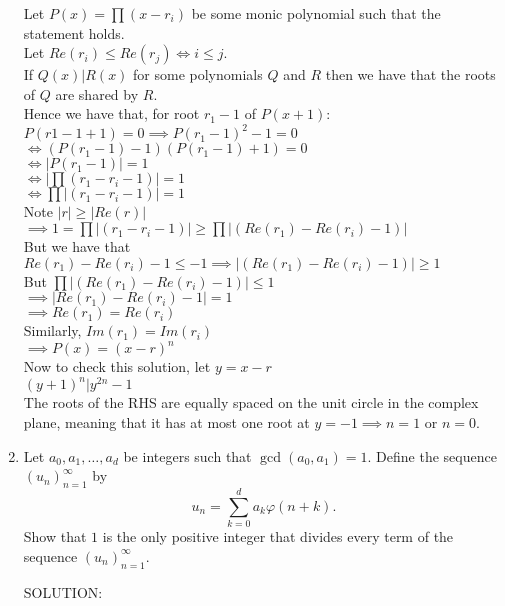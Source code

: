\documentclass{article}
\begin{document}
\begin{enumerate}[1.]
Let $P(x) = \prod (x-r_{i})$ be some monic polynomial such that the statement holds.\\
Let $Re(r_{i}) \leq Re(r_{j})\iff {i} \leq {j}$.\\
If $Q(x)|R(x)$ for some polynomials $Q$ and $R$ then we have that the roots of $Q$ are shared by $R$.\\
Hence we have that, for root $r_{1}-1$ of $P(x+1)$:\\
$P(r{1}-1+1) = 0\implies P(r_{1}-1)^{2}-1 = 0$\\
$\iff (P(r_{1}-1)-1)(P(r_{1}-1)+1) = 0$\\
$\iff |P(r_{1}-1)| = 1$\\
$\iff |\prod (r_{1}-r_{i}-1)| = 1$\\
$\iff \prod|(r_{1}-r_{i}-1)| = 1$\\
Note $|r| \geq |Re(r)|$\\
$\implies 1 = \prod|(r_{1}-r_{i}-1)| \geq \prod|(Re(r_{1})-Re(r_{i})-1)|$\\
But we have that $Re(r_{1})-Re(r_{i})-1 \leq -1 \implies |(Re(r_{1})-Re(r_{i})-1)| \geq 1$\\
But $\prod|(Re(r_{1})-Re(r_{i})-1)| \leq 1$\\ 
$\implies |Re(r_{1})-Re(r_{i})-1| = 1$\\
$\implies Re(r_{1}) = Re(r_{i})$\\
Similarly, $Im(r_{1}) = Im(r_{i})$\\
$\implies P(x) = (x-r)^{n}$\\
Now to check this solution, let $y = x-r$\\
$(y+1)^{n}|y^{2n}-1$\\
The roots of the RHS are equally spaced on the unit circle in the complex plane, meaning that it has at most one root at $y=-1\implies n=1$ or $n=0$.

\vfill
\item %
Let $a_0, a_1, \dots, a_d$ be integers such that $\gcd(a_0, a_1) = 1$. Define the sequence $(u_n)_{n=1}^{\infty}$ by
\[
  u_n = \sum_{k = 0}^{d} a_k \varphi(n + k).
\]
Show that $1$ is the only positive integer that divides every term of the sequence $(u_n)_{n = 1}^{\infty}$.

SOLUTION:\\


\end{enumerate}
\end{document}
